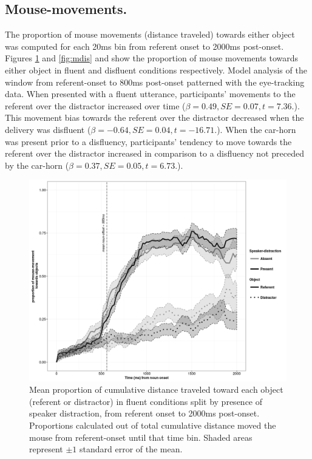 \documentclass[a4paper,man,natbib]{apa6}
\begin{document}
\subsection{Mouse-movements.}
The proportion of mouse movements (distance traveled) towards either object was computed for each 20ms bin from referent onset to 2000ms post-onset. 
Figures \ref{fig:mflu} and \ref{fig:mdis} and show the proportion of mouse movements towards either object in fluent and disfluent conditions respectively. 
Model analysis of the window from referent-onset to 800ms post-onset patterned with the eye-tracking data. 
When presented with a fluent utterance, participants' movements to the referent over the distractor increased over time ($\beta = 0.49, SE = 0.07, t=7.36.$). 
This movement bias towards the referent over the distractor decreased when the delivery was disfluent ($\beta = -0.64, SE = 0.04, t=-16.71.$). 
When the car-horn was present prior to a disfluency, participants' tendency to move towards the referent over the distractor increased in comparison to a disfluency not preceded by the car-horn ($\beta = 0.37, SE = 0.05, t=6.73.$).\\



\begin{figure}[Ht]
  \centering
	\includegraphics[scale=.5]{mflu.png}
  \caption{Mean proportion of cumulative distance traveled toward each object (referent or distractor) in fluent conditions split by presence of speaker distraction, from referent onset to 2000ms post-onset. Proportions calculated out of total cumulative distance moved the mouse from referent-onset until that time bin. Shaded areas represent $\pm 1$ standard error of the mean.}
  \label{fig:mflu}
\end{figure}
\end{document}
